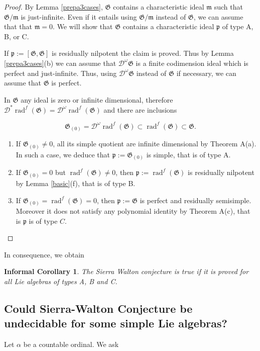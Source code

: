 \documentclass[11pt, letterpaper, reqno]{amsart}
\newtheorem*{infcor}{Informal Corollary}
\theoremstyle{definition}
\newcommand{\rad}{\operatorname{rad}}
\newcommand{\cD}{\mathscr D}
\newcommand{\fm}{\mathfrak{m}}
\newcommand{\fp}{\mathfrak{p}}
\newcommand{\fG}{\mathfrak{G}}
\begin{document}
\begin{proof} By Lemma \ref{prepa3cases},
$\fG$ contains a characteristic ideal $\fm$ such that  $\fG/\fm$ is just-infinite. Even if it entails using $\fG/\fm$ instead of $\fG$, we can assume that that $\fm=0$. We will show that
$\fG$ contains a characteristic ideal $\fp$ 
of type A, B, or C.

If $\fp:=[\fG,\fG]$ is residually nilpotent the claim is proved. Thus by Lemma \ref{prepa3cases}(b)
we can assume that 
$\cD^\omega\fG$ is a finite 
codimension ideal which is perfect and just-infinite. Thus, using $\cD^\omega\fG$ instead of
$\fG$ if necessary, we can assume that $\fG$
is perfect.

In $\fG$ any ideal is zero or infinite dimensional,  therefore
$\cD^*\rad^f(\fG)=\cD^{\omega}\rad^f(\fG)$ and there are inclusions

$$\fG_{(0)}=\cD^{\omega}\rad^f(\fG)
\subset\rad^f(\fG)\subset\fG.$$

\begin{enumerate}
\item[(a)] If $\fG_{(0)}\neq 0$, all its simple quotient are infinite dimensional by Theorem A(a). In such a case, we deduce that $\fp:=\fG_{(0)}$ is simple, that is of type A. 

\item[(b)] If $\fG_{(0)}=0$ but $\rad^f(\fG)\neq 0$,
then $\fp:=\rad^f(\fG)$ is residually nilpotent by Lemma \ref{basic}(f), that is of type B.

\item[(c)] If $\fG_{(0)}=\rad^f(\fG)=0$, then
$\fp:=\fG$ is  perfect and residually semisimple. Moreover it does not satisfy any polynomial identity by
Theorem A(c), that is 
$\fp$ is of type $C$.
\end{enumerate}
\end{proof}

In consequence, we obtain

\begin{infcor} 
The Sierra Walton conjecture 
is true  if it is proved for all Lie algebras of types A, B and C.
\end{infcor}


\subsection{Could Sierra-Walton Conjecture be undecidable for some simple Lie algebras?}\label{undecidable}


Let $\alpha$ be a countable  ordinal. We ask
\end{document}
